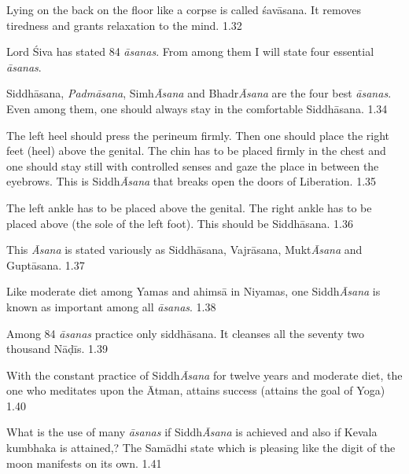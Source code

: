 
Lying on the back on the floor like a corpse is called śavāsana. It removes tiredness and grants relaxation to the mind. 1.32


Lord Śiva has stated 84 \textit{āsanas}. From among them I will state four essential \textit{āsanas}.


Siddhāsana, \textit{Padmāsana}, Simh\textit{Āsana} and Bhadr\textit{Āsana} are the four best \textit{āsanas}. Even among them, one should always stay in the comfortable Siddhāsana.  1.34


The left heel should press the perineum firmly. Then one should place the right feet (heel) above the genital.  The chin has to be placed firmly in the chest and one should stay still with controlled senses and gaze the place in between the eyebrows. This is Siddh\textit{Āsana} that breaks open the doors of Liberation.  1.35


The left ankle has to be placed above the genital. The right ankle has to be placed above (the sole of the left foot). This should be Siddhāsana. 1.36


This \textit{Āsana} is stated variously as Siddhāsana, Vajrāsana, Mukt\textit{Āsana} and Guptāsana. 1.37


Like moderate diet  among Yamas and ahimsā in Niyamas, one Siddh\textit{Āsana} is known as important among all \textit{āsanas}.  1.38

Among 84 \textit{āsanas} practice only siddhāsana. It cleanses all the seventy two thousand Nāḍīs.  1.39

With the constant practice of Siddh\textit{Āsana} for twelve years and moderate diet, the one who meditates upon the Ātman,  attains success (attains the goal of Yoga) 1.40

What is the use of many \textit{āsanas} if Siddh\textit{Āsana} is achieved and also if Kevala kumbhaka is attained,? The Samādhi state which is pleasing like the digit of the moon manifests on its own. 1.41

